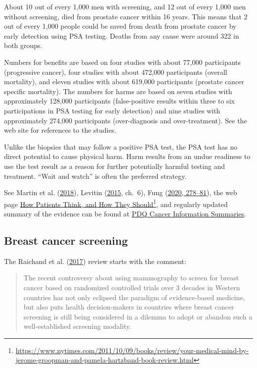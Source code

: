 \documentclass[
  10ptls,
  b5paper]{book}
\begin{document}
About 10 out of every 1,000 men with screening, and 12 out of every
1,000 men without screening, died from prostate cancer within 16 years.
This means that 2 out of every 1,000 people could be saved from death
from prostate cancer by early detection using PSA testing. Deaths from
any cause were around 322 in both groups.

Numbers for benefits are based on four studies with about 77,000
participants (progressive cancer), four studies with about 472,000
participants (overall mortality), and eleven studies with about 619,000
participants (prostate cancer specific mortality). The numbers for harms
are based on seven studies with approximately 128,000 participants
(false-positive results within three to six participations in PSA
testing for early detection) and nine studies with approximately 274,000
participants (over-diagnosis and over-treatment). See the web site for
references to the studies.

Unlike the biopsies that may follow a positive PSA test, the PSA test
has no direct potential to cause physical harm. Harm results from an
undue readiness to use the test result as a reason for further
potentially harmful testing and treatment. ``Wait and watch'' is often the
preferred strategy.

See Martin et al. (\protect\hyperlink{ref-martin2018effect}{2018}), Levitin (\protect\hyperlink{ref-levitin_2015}{2015}, ch.~6), Fung (\protect\hyperlink{ref-fung2020cancer}{2020, 278--81}), the web page \href{https://www.nytimes.com/2011/10/09/books/review/your-medical-mind-by-jerome-groopman-and-pamela-hartzband-book-review.html}{How Patients Think, and How They
Should}\footnote{\url{https://www.nytimes.com/2011/10/09/books/review/your-medical-mind-by-jerome-groopman-and-pamela-hartzband-book-review.html}},
and regularly updated summary of the evidence can be found at \href{https://www.ncbi.nlm.nih.gov/books/NBK65906/}{PDQ
Cancer Information
Summaries}.

\hypertarget{breast-cancer-screening}{%
\subsection*{Breast cancer screening}\label{breast-cancer-screening}}

The Raichand et al. (\protect\hyperlink{ref-raichand2017conclusions}{2017}) review starts with the comment:

\begin{quote}
The recent controversy about using mammography to screen for breast
cancer based on randomized controlled trials over 3 decades in Western
countries has not only eclipsed the paradigm of evidence-based
medicine, but also puts health decision-makers in countries where
breast cancer screening is still being considered in a dilemma to
adopt or abandon such a well-established screening modality.
\end{quote}
\end{document}
